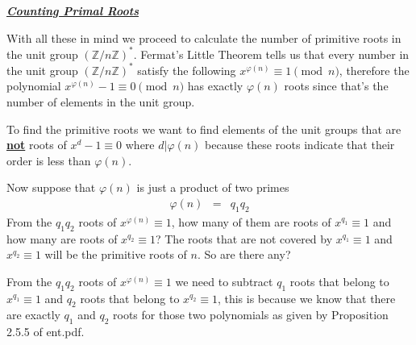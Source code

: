 \documentclass[aps,preprint,preprintnumbers,nofootinbib,showpacs,prd]{revtex4-1}
\newcommand{\nbea}{\begin{eqnarray*}}
\newcommand{\neea}{\end{eqnarray*}}
\begin{document}
\bigskip
\underline{\textit{\textbf{Counting Primal Roots}}}
\bigskip

With all these in mind we proceed to calculate the number of primitive roots in the unit group $(\mathbb{Z}/n\mathbb{Z})^*$. Fermat's Little Theorem tells us that every number in the unit group $(\mathbb{Z}/n\mathbb{Z})^*$ satisfy the following $x^{\varphi(n)} \equiv 1 \pmod{n}$, therefore the polynomial $x^{\varphi(n)} - 1 \equiv 0 \pmod{n}$ has exactly $\varphi(n)$ roots since that's the number of elements in the unit group.

To find the primitive roots we want to find elements of the unit groups that are \underline{{\bf not}} roots of $x^d - 1 \equiv 0$ where $d|\varphi(n)$ because these roots indicate that their order is less than $\varphi(n)$.

Now suppose that $\varphi(n)$ is just a product of two primes
%
\nbea
\varphi(n) & = & q_1q_2
\neea
%
From the $q_1q_2$ roots of $x^{\varphi(n)} \equiv 1$, how many of them are roots of $x^{q_1} \equiv 1$ and how many are roots of $x^{q_2} \equiv 1$? The roots that are not covered by $x^{q_{1}} \equiv 1$ and $x^{q_{2}} \equiv 1$ will be the primitive roots of $n$. So are there any?

From the $q_1q_2$ roots of $x^{\varphi(n)} \equiv 1$ we need to subtract $q_1$ roots that belong to $x^{q_1} \equiv 1$ and $q_2$ roots that belong to $x^{q_2} \equiv 1$, this is because we know that there are exactly $q_1$ and $q_2$ roots for those two polynomials as given by Proposition 2.5.5 of ent.pdf.
\end{document}
